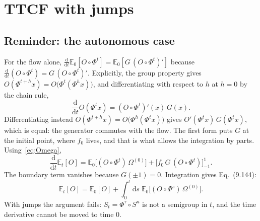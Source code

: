 \documentclass[11pt,a4paper]{article}
\theoremstyle{remark}
\newcommand{\E}{\mathbb{E}}
\newcommand{\dd}{\mathrm{d}}
\begin{document}
\section{TTCF with jumps}

\subsection{Reminder: the autonomous case}
For the flow alone,
$\frac{\dd}{\dd t}\E_0[O\circ\Phi^t]=\E_0[G\,(O\circ\Phi^t)']$ because
$\frac{\dd}{\dd t}(O\circ\Phi^t) = G\,(O\circ\Phi^t)'$. Explicitly, the group
property gives $O(\Phi^{t+h}x)=O\big(\Phi^t(\Phi^hx)\big)$, and differentiating
with respect to $h$ at $h=0$ by the chain rule,
\begin{equation}
  \frac{\dd}{\dd t}O(\Phi^tx) = (O\circ\Phi^t)'(x)\,G(x).
\end{equation}
Differentiating instead $O(\Phi^{t+h}x)=O\big(\Phi^h(\Phi^tx)\big)$ gives
$O'(\Phi^tx)\,G(\Phi^tx)$, which is equal: the generator commutes with the
flow. The first form puts $G$ at the initial point, where $f_0$ lives, and
that is what allows the integration by parts. Using~\eqref{eq:Omega},
\begin{equation}\label{eq:autonomous}
  \frac{\dd}{\dd t}\E_t[O] = \E_0\big[(O\circ\Phi^t)\,\Omega^{(0)}\big]
  + \Big[f_0\,G\,(O\circ\Phi^t)\Big]_{-1}^{1}.
\end{equation}
The boundary term vanishes because $G(\pm1)=0$. Integration gives Eq.~(9.144):
\begin{equation}
  \E_t[O]=\E_0[O]+\int_0^t\dd s\;\E_0\big[(O\circ\Phi^s)\,\Omega^{(0)}\big].
\end{equation}
With jumps the argument fails: $S_t=\Phi^\tau\circ S^n$ is not a semigroup in
$t$, and the time derivative cannot be moved to time $0$.
\end{document}
